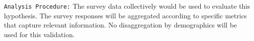 \texttt{Analysis Procedure:}
The survey data collectively would be used to evaluate this hypothesis.  The survey responses will be aggregated according to specific metrics that capture relevant information. No disaggregation by demographics will be used for this validation.

